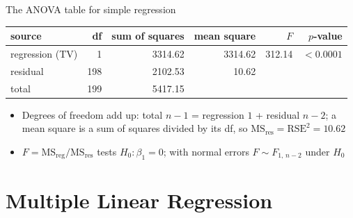 \begin{frame}{The ANOVA table for simple regression}
    \begin{center}
        \small
        \begin{tabular}{lrrrrr}
            \toprule
            source & df & sum of squares & mean square & $F$ & $p$-value \\
            \midrule
            regression (TV) & 1 & 3314.62 & 3314.62 & 312.14 & $<0.0001$ \\
            residual & 198 & 2102.53 & 10.62 & & \\
            total & 199 & 5417.15 & & & \\
            \bottomrule
        \end{tabular}
    \end{center}
    \begin{itemize}
        \item Degrees of freedom add up: total $n-1$ = regression $1$ + residual $n-2$; a mean square is a sum of squares divided by its df, so $\mathrm{MS}_{\text{res}} = \mathrm{RSE}^2 = 10.62$
        \item $F = \mathrm{MS}_{\text{reg}} / \mathrm{MS}_{\text{res}}$ tests $H_0\colon \beta_1 = 0$; with normal errors $F \sim F_{1,\, n-2}$ under $H_0$
    \end{itemize}
\end{frame}


\section{Multiple Linear Regression}



